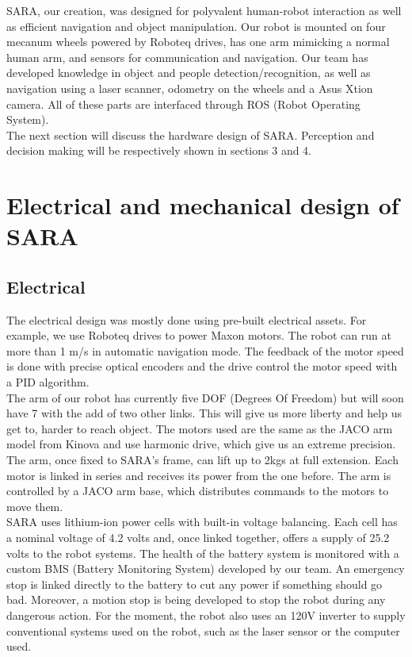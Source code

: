 \documentclass[runningheads,a4paper]{llncs}
\begin{document}
SARA, our creation, was designed for polyvalent human-robot interaction as well as efficient navigation and object manipulation. Our robot is mounted on four mecanum wheels powered by Roboteq drives, has one arm mimicking a normal human arm, and sensors for communication and navigation. Our team has developed knowledge in object and people detection/recognition, as well as navigation using a laser scanner, odometry on the wheels and a Asus Xtion camera. All of these parts are interfaced through ROS (Robot Operating System). \\

The next section will discuss the hardware design of SARA. Perception and decision making will be respectively shown in sections 3 and 4.


\section{Electrical and mechanical design of SARA}
\subsection{Electrical}
\tab The electrical design was mostly done using pre-built electrical assets. For example, we use Roboteq drives to power Maxon motors. The robot can run at more than 1 m/s in automatic navigation mode. The feedback of the motor speed is done with precise optical encoders and the drive control the motor speed with a PID algorithm. \\

The arm of our robot has currently five DOF (Degrees Of Freedom) but will soon have 7 with the add of two other links. This will give us more liberty and help us get to, harder to reach object. The motors used are the same as the JACO arm model from Kinova and use harmonic drive, which give us an extreme precision. The arm, once fixed to SARA’s frame, can lift up to 2kgs at full extension. Each motor is linked in series and receives its power from the one before. The arm is controlled by a JACO arm base, which distributes commands to the motors to move them. \\

SARA uses lithium-ion power cells with built-in voltage balancing. Each cell has a nominal voltage of 4.2 volts and, once linked together, offers a supply of 25.2 volts to the robot systems. The health of the battery system is monitored with a custom BMS (Battery Monitoring System) developed by our team. An emergency stop is linked directly to the battery to cut any power if something should go bad. Moreover, a motion stop is being developed to stop the robot during any dangerous action. For the moment, the robot also uses an 120V inverter to supply conventional systems used on the robot, such as the laser sensor or the computer used. \\
\end{document}
